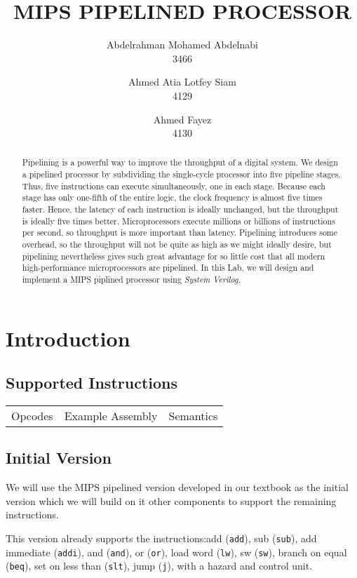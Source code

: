 \documentclass[titlepage,12pt,twoside,a4paper]{article}
\title{MIPS PIPELINED PROCESSOR}
\author{
	Abdelrahman Mohamed Abdelnabi\\
	3466
	\and
	Ahmed Atia Lotfey Siam \\
	4129
	\and
	Ahmed Fayez \\
	4130
}
\newcommand{\code}[1]{{\texttt{#1}}}
\begin{document}
\maketitle

\begin{abstract}
	Pipelining is a powerful way to improve the	throughput of a digital system. We design a pipelined processor by subdividing the single-cycle processor into five pipeline stages. Thus, five instructions can execute simultaneously, one in each stage. Because each stage has only one-fifth of the entire logic, the clock frequency is almost five times faster. Hence, the latency of each instruction is ideally unchanged, but the throughput is ideally five times better. Microprocessors execute millions or billions of instructions per second, so throughput is more important than latency. Pipelining introduces some overhead, so the throughput will not be quite as high as we might ideally desire, but pipelining nevertheless gives such great advantage for so little cost that all modern high-performance microprocessors are pipelined.
	In this Lab, we will design and implement a MIPS piplined  processor using\textit{ System Verilog}.
\end{abstract}



\section{Introduction}
\subsection{Supported Instructions}
\begin{tabular}{ccc}
	\label{ISA}
	Opcodes & Example Assembly & Semantics \\
	
\end{tabular}

\subsection{Initial Version}
We will use the MIPS pipelined version developed in our textbook as the initial version which we will build on it other components to support the remaining instructions.

This version already supports the instructions:add (\code{add}), sub (\code{sub}), add immediate (\code{addi}), and (\code{and}), or (\code{or}), load word (\code{lw}), sw (\code{sw}), branch on equal (\code{beq}), set on less than (\code{slt}), jump (\code{j}), with a hazard and control unit.
\end{document}

